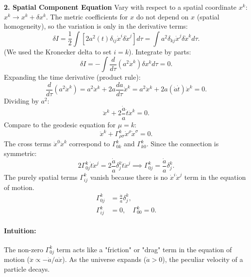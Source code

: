 \documentclass[11pt, a4paper]{report}
\begin{document}
\textbf{2. Spatial Component Equation}
Vary with respect to a spatial coordinate \(x^k\): \(x^k \to x^k + \delta x^k\).
The metric coefficients for \(x\) do not depend on \(x\) (spatial homogeneity), so the variation is only in the derivative terms:
\begin{equation}
\delta I = \frac{1}{2} \int \left[ 2 a^2(t) \delta_{ij} \dot{x}^i \delta \dot{x}^j \right] d\tau = \int a^2 \delta_{kj} \dot{x}^j \delta \dot{x}^k d\tau.
\end{equation}
(We used the Kronecker delta to set \(i=k\)).
Integrate by parts:
\begin{equation}
\delta I = -\int \frac{d}{d\tau} (a^2 \dot{x}^k) \delta x^k d\tau = 0.
\end{equation}
Expanding the time derivative (product rule):
\begin{equation}
\frac{d}{d\tau} (a^2 \dot{x}^k) = a^2 \ddot{x}^k + 2a \frac{da}{d\tau} \dot{x}^k = a^2 \ddot{x}^k + 2a (\dot{a} \dot{t}) \dot{x}^k = 0.
\end{equation}
Dividing by \(a^2\):
\begin{equation}
\ddot{x}^k + 2\frac{\dot{a}}{a} \dot{t} \dot{x}^k = 0.
\end{equation}
Compare to the geodesic equation for \(\mu=k\):
\begin{equation}
\ddot{x}^k + \Gamma^k_{\rho\sigma} \dot{x}^\rho \dot{x}^\sigma = 0.
\end{equation}
The cross terms \(\dot{x}^0 \dot{x}^k\) correspond to \(\Gamma^k_{0k}\) and \(\Gamma^k_{k0}\). Since the connection is symmetric:
\begin{equation}
2\Gamma^k_{0j} \dot{t} \dot{x}^j = 2\frac{\dot{a}}{a} \delta^k_j \dot{t} \dot{x}^j \implies \Gamma^k_{0j} = \frac{\dot{a}}{a} \delta^k_j.
\end{equation}
The purely spatial terms \(\Gamma^k_{ij}\) vanish because there is no \(\dot{x}^i \dot{x}^j\) term in the equation of motion.
\begin{align}
\Gamma^k_{0j} &= \frac{\dot{a}}{a} \delta^k_j, \\
\Gamma^k_{ij} &= 0, \quad \Gamma^k_{00} = 0.
\end{align}
\paragraph{Intuition:} The non-zero \(\Gamma^k_{0j}\) term acts like a "friction" or "drag" term in the equation of motion (\(\ddot{x} \propto -\dot{a}/a \dot{x}\)). As the universe expands (\(\dot{a} > 0\)), the peculiar velocity of a particle decays.
\end{document}
